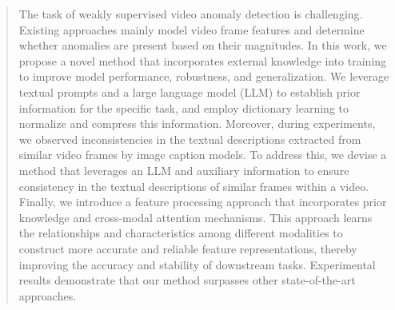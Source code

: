 \begin{abstract}
The task of weakly supervised video anomaly detection is challenging. Existing approaches mainly model video frame features and determine whether anomalies are present based on their magnitudes. In this work, we propose a novel method that incorporates external knowledge into training to improve model performance, robustness, and generalization. We leverage textual prompts and a large language model (LLM) to establish prior information for the specific task, and employ dictionary learning to normalize and compress this information. Moreover, during experiments, we observed inconsistencies in the textual descriptions extracted from similar video frames by image caption models. To address this, we devise a method that leverages an LLM and auxiliary information to ensure consistency in the textual descriptions of similar frames within a video. Finally, we introduce a feature processing approach that incorporates prior knowledge and cross-modal attention mechanisms. This approach learns the relationships and characteristics among different modalities to construct more accurate and reliable feature representations, thereby improving the accuracy and stability of downstream tasks. Experimental results demonstrate that our method surpasses other state-of-the-art approaches.
\end{abstract}
